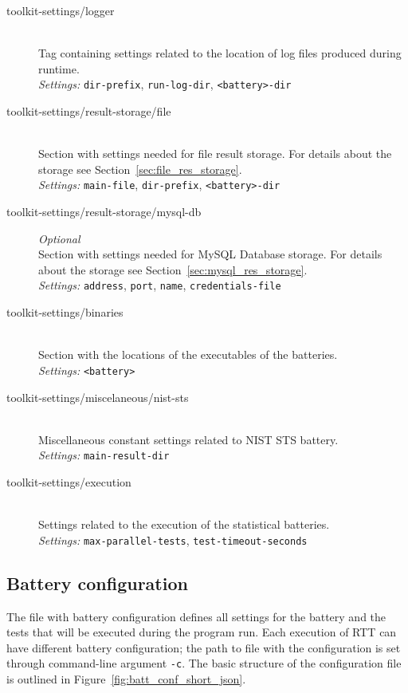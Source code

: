 \documentclass[
  digital,  	%
  color,		%
  oneside,   	%
  12pt,
  nocover,
  notable,
  nolof,
  nolot,
]{fithesis3}
\begin{document}
\begin{description}
\item[toolkit-settings/logger] \hfill \\
Tag containing settings related to the location of log files produced during runtime. \\
\textit{Settings: } \texttt{dir-prefix}, \texttt{run-log-dir}, \texttt{<battery>-dir}

\item[toolkit-settings/result-storage/file] \hfill \\
Section with settings needed for file result storage. For details about the storage see Section~\ref{sec:file_res_storage}. \\
\textit{Settings: } \texttt{main-file}, \texttt{dir-prefix}, \texttt{<battery>-dir}

\item[toolkit-settings/result-storage/mysql-db] \textit{Optional} \hfill \\
Section with settings needed for MySQL Database storage. For details about the storage see Section~\ref{sec:mysql_res_storage}. \\
\textit{Settings: } \texttt{address}, \texttt{port}, \texttt{name}, \texttt{credentials-file}

\item[toolkit-settings/binaries] \hfill \\
Section with the locations of the executables of the batteries. \\
\textit{Settings: } \texttt{<battery>}

\item[toolkit-settings/miscelaneous/nist-sts] \hfill \\
Miscellaneous constant settings related to NIST STS battery. \\
\textit{Settings: } \texttt{main-result-dir}

\item[toolkit-settings/execution] \hfill \\
Settings related to the execution of the statistical batteries. \\
\textit{Settings: } \texttt{max-parallel-tests}, \texttt{test-timeout-seconds}

\end{description}

\subsection{Battery configuration}
\label{sec:batt_conf}
The file with battery configuration defines all settings for the battery and the tests that will be executed during the program run. Each execution of RTT can have different battery configuration; the path to file with the configuration is set through command-line argument \texttt{-c}. The basic structure of the configuration file is outlined in Figure~\ref{fig:batt_conf_short_json}. 
\end{document}
